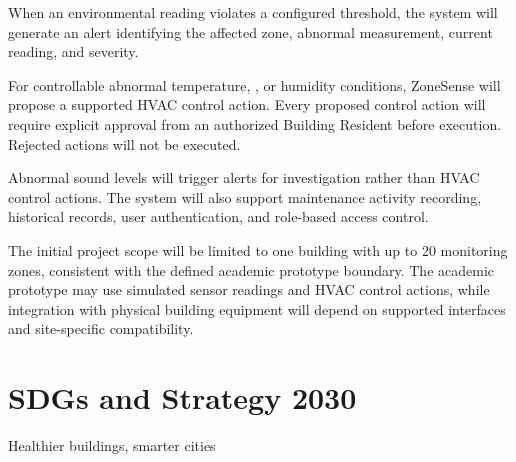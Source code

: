 \documentclass[11pt,a4paper]{article}
\begin{document}
When an environmental reading violates a configured threshold, the system will generate an alert identifying the affected zone, abnormal measurement, current reading, and severity.

For controllable abnormal temperature, \COtwo, or humidity conditions, ZoneSense will propose a supported HVAC control action. Every proposed control action will require explicit approval from an authorized Building Resident before execution. Rejected actions will not be executed.

Abnormal sound levels will trigger alerts for investigation rather than HVAC control actions. The system will also support maintenance activity recording, historical records, user authentication, and role-based access control.

The initial project scope will be limited to one building with up to 20 monitoring zones, consistent with the defined academic prototype boundary. The academic prototype may use simulated sensor readings and HVAC control actions, while integration with physical building equipment will depend on supported interfaces and site-specific compatibility.

\clearpage
\section*{SDGs and Strategy 2030}
{\large\color{znavy} Healthier buildings, smarter cities\par}
\vspace{14pt}
\end{document}
